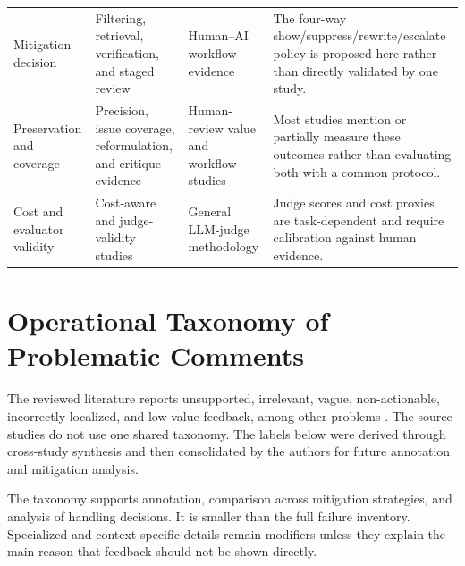 \documentclass[10pt]{article}
\begin{document}
\begin{longtable}{@{}>{\raggedright\arraybackslash}p{}>{\raggedright\arraybackslash}p{}>{\raggedright\arraybackslash}p{}>{\raggedright\arraybackslash}p{}@{}}
Mitigation decision & Filtering, retrieval, verification, and staged review \cite{p10_sun2025_bitsai_cr,p11_zhang2025_laura,p35_mcaleese2024_llm_critics,p65_ameen2026_qasecclaw} & Human--AI workflow evidence \cite{p07_olewicki2024_revmate} & The four-way show/suppress/rewrite/escalate policy is proposed here rather than directly validated by one study. \\
Preservation and coverage & Precision, issue coverage, reformulation, and critique evidence \cite{p10_sun2025_bitsai_cr,p18_bensghaier2025_curated_reviews,p58_jin2026_reliable_code_reviewers} & Human-review value and workflow studies \cite{p37_sadowski2018_google_mcr,p38_bacchelli2013_expectations_mcr} & Most studies mention or partially measure these outcomes rather than evaluating both with a common protocol. \\
Cost and evaluator validity & Cost-aware and judge-validity studies \cite{p01_lu2025_deepcrceval,p29_wang2025_human_evaluators,p31_jiang2025_codejudgebench} & General LLM-judge methodology \cite{p33_he2025_llmjudge_se,p36_li2024_llms_as_judges} & Judge scores and cost proxies are task-dependent and require calibration against human evidence. \\
\end{longtable}
\endgroup




\section{Operational Taxonomy of Problematic Comments}

The reviewed literature reports unsupported, irrelevant, vague, non-actionable, incorrectly localized, and low-value feedback, among other problems \cite{p02_tantithamthavorn2026_hallujudge,p08_liu2025_too_noisy,p19_nguyen2025_fine_grained_classification,p35_mcaleese2024_llm_critics,p57_heumuller2025_relevance_reviews,p60_ahmed2025_feedback_useful}. The source studies do not use one shared taxonomy. The labels below were derived through cross-study synthesis and then consolidated by the authors for future annotation and mitigation analysis.

The taxonomy supports annotation, comparison across mitigation strategies, and analysis of handling decisions. It is smaller than the full failure inventory. Specialized and context-specific details remain modifiers unless they explain the main reason that feedback should not be shown directly.
\end{document}
